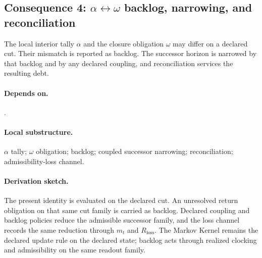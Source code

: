 \subsection{Consequence 4: \texorpdfstring{$\alpha\leftrightarrow\omega$}{alpha-omega} backlog, narrowing, and reconciliation}
\begin{consequence}\label{cons:c4}
The local interior tally $\alpha$ and the closure obligation $\omega$ may differ on a declared cut. Their mismatch is reported as backlog. The successor horizon is narrowed by that backlog and by any declared coupling, and reconciliation services the resulting debt.
\end{consequence}
\paragraph{Depends on.} .
\paragraph{Local substructure.} $\alpha$ tally; $\omega$ obligation; backlog; coupled successor narrowing; reconciliation; admissibility-loss channel.
\paragraph{Derivation sketch.} The present identity is evaluated on the declared cut. An unresolved return obligation on that same cut family is carried as backlog. Declared coupling and backlog policies reduce the admissible successor family, and the loss channel records the same reduction through $m_t$ and $R_{\mathrm{loss}}$. The Markov Kernel remains the declared update rule on the declared state; backlog acts through realized clocking and admissibility on the same readout family.
